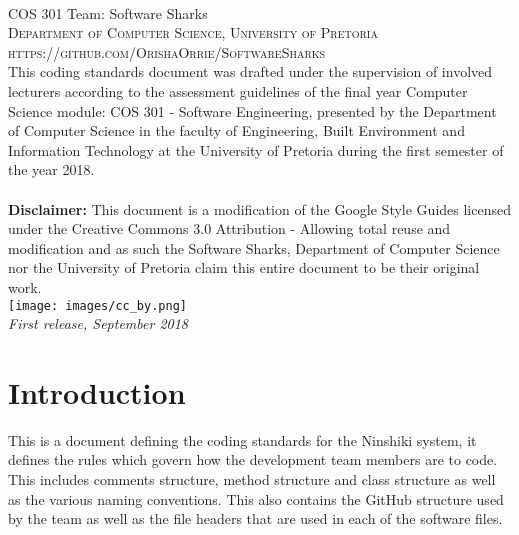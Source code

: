 \documentclass[a4paper, 11pt]{article}
\begin{document}
\pagebreak


\newpage
~\vfill
\thispagestyle{empty}

\noindent COS 301 Team: Software Sharks\\ 

\noindent \textsc{Department of Computer Science, University of Pretoria}\\

\noindent \textsc{https://github.com/OrishaOrrie/SoftwareSharks}\\ %

\noindent This coding standards document was drafted under the supervision of involved lecturers according to the assessment guidelines of the final year Computer Science module: COS 301 - Software Engineering, presented by the Department of Computer Science in the faculty of Engineering, Built Environment and Information Technology at the University of Pretoria during the first semester of the year 2018. \\ \\
\textbf{Disclaimer: }This document is a modification of the Google Style Guides licensed under the Creative Commons 3.0 Attribution - Allowing total reuse and modification and as such the Software Sharks, Department of Computer Science nor the University of Pretoria claim this entire document to be their original work. \\ %
\texttt{[image: images/cc\_by.png]} \\

\noindent \textit{First release, September 2018} %

\pagebreak

\tableofcontents

\pagebreak


\section{Introduction}
This is a document defining the coding standards for the Ninshiki system, it defines the rules which govern how the development team members are to code. This includes comments structure, method structure and class structure as well as the various naming conventions. This also contains the GitHub structure used by the team as well as the file headers that are used in each of the software files.
\end{document}

